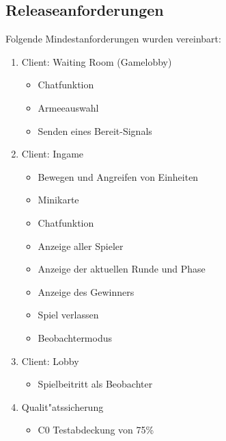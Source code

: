 \documentclass[12pt, titlepage]{scrartcl}
\begin{document}
        \subsection{Releaseanforderungen}
            Folgende Mindestanforderungen wurden vereinbart:
            \begin{enumerate}
                \item Client: Waiting Room (Gamelobby)
                \begin{itemize}
                    \item Chatfunktion
                    \item Armeeauswahl
                    \item Senden eines Bereit-Signals
                \end{itemize}
                \item Client: Ingame
                \begin{itemize}
                    \item Bewegen und Angreifen von Einheiten
                    \item Minikarte
                    \item Chatfunktion
                    \item Anzeige aller Spieler
                    \item Anzeige der aktuellen Runde und Phase
                    \item Anzeige des Gewinners
 					\item Spiel verlassen
			\item Beobachtermodus
                \end{itemize}
                \item Client: Lobby
                \begin{itemize}
                    \item Spielbeitritt als Beobachter
                \end{itemize}
                \item Qualit"atssicherung
                \begin{itemize}
                    \item C0 Testabdeckung von 75\%
                \end{itemize}
            \end{enumerate}
\end{document}
